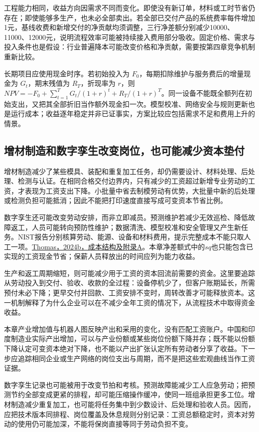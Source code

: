 \documentclass[UTF8,fontset=windows,12pt,a4paper,oneside,openany]{ctexbook}
\begin{document}
工程能力相同，收益方向因需求不同而变化。即使没有新订单，材料或工时节省仍存在；即使能够多生产，也未必全部卖出。若全部已交付产品的系统费率每件增加1元，基线收费和新增交付的净贡献均须调整，三行净差额分别减少10000、11000、12000元，说明流程效率可能被持续接入费用部分吸收。固定价格、需求与投入条件也是假设：行业普遍降本可能改变价格和净贡献，需要按第四章竞争机制重新比较。

长期项目应使用现金时序。若初始投入为 $F_0$，每期扣除维护与服务费后的增量现金为 $G_t$，期末残值为 $R_T$，折现率为 $r$，则 $NPV=-F_0+\sum_{t=1}^{T}G_t/(1+r)^t+R_T/(1+r)^T$。同一设备不能既全额列在初始支出，又把其全部折旧当作额外现金扣一次。模型校准、网络安全与规则更新也是运行成本；收益逐年稳定并非已证事实，方案比较应包括需求不足和费用上升的情景。

\subsection{增材制造和数字孪生改变岗位，也可能减少资本垫付}

增材制造减少了某些模具、装配和重复加工任务，却仍需要设计、材料处理、后处理、检测与认证。在相同合格交付边界内，只有减少的工资超过新增专业劳动的工资，才表现为工资支出下降。小批量中省去制模劳动有优势，大批量中新的后处理或检测负担可能抵消；因此不能把打印速度直接写成可变资本节省比例。

数字孪生还可能改变劳动安排，而非立即减员。预测维护若减少无效巡检、降低故障返工，人员可能转向预防性维护；数据清洗、模型校准和安全管理又产生新任务。NIST报告分别核算劳动、能源、设备和材料费用，提示完整成本不能只取人工一项。\href{https://nvlpubs.nist.gov/nistpubs/ams/NIST.AMS.100-61.pdf}{Thomas，2024b，成本结构及附录A}。本章净差额式中的$sq$也只能包含已实现的工资现金节省；保薪人员释放出的时间应列为能力收益。

生产和返工周期缩短，则可能减少用于工资的资本回流前需要的资金。这里要追踪从劳动投入到交付、验收、收款的全过程：设备停机少了，但客户账期延长，所需预付未必下降；更早交付并回款、工资安排不变时，周转改善才可能释放资本。这一机制解释了为什么企业可以在不减少全年工资的情况下，从流程技术中取得资金收益。

本章产业增加值与机器人图反映产出和采用的变化，没有匹配工资账户。中国和印度制造业实际产出增加，可以与产业份额或某些岗位份额下降并存；既不能以份额下降认定可变资本绝对下降，也不能以产出扩张认定所有劳动者分享了收益。下一步应追踪相同企业或生产网络的岗位支出与周期，而不是把这些宏观曲线当作工资证据。

数字孪生记录也可能被用于改变节拍和考核。预测故障能减少工人应急劳动；把预测节约全部变成更紧的排程，却可能压缩操作缓冲，使同一班组承担更多工位。增材制造减少重复加工，也可能将任务集中到少数设计、后处理和验收人员。因而，应把技术版本同排程、岗位覆盖及休息规则分别记录：工资总额稳定时，资本对劳动的使用仍可能加深，不能将保岗直接等同于劳动负担不变。
\end{document}

